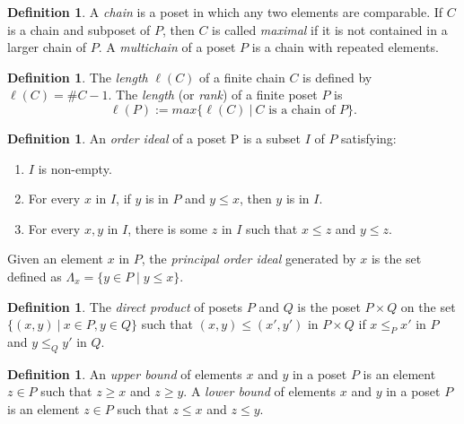 \documentclass[psamsfonts]{amsart}
\theoremstyle{definition}
\newtheorem{defn}[thm]{Definition}
\theoremstyle{remark}
\numberwithin{equation}{section}
\begin{document}
\begin{defn}
A \textit{chain} is a poset in which any two elements are comparable. If $C$ is a chain and subposet of $P$, then $C$ is called \textit{maximal} if it is not contained in a larger chain of $P$. A \textit{multichain} of a poset $P$ is a chain with repeated elements. 
\end{defn}
\begin{defn}
The \textit{length} $\ell(C)$ of a finite chain $C$ is defined by $\ell(C) = \#C - 1$. The \textit{length} (or \textit{rank}) of a finite poset $P$ is
\begin{equation*}
    \ell(P) := max\{\ell(C) \ | \ C \text{ is a chain of } P\}.
\end{equation*}
\end{defn}

\begin{defn}
An \textit{order ideal} of a poset P is a subset $I$ of $P$ satisfying:
\begin{enumerate}
    \item $I$ is non-empty.
    \item For every $x$ in $I$, if $y$ is in $P$ and $y\leq x$, then $y$ is in $I$.
    \item For every $x,y$ in $I$, there is some $z$ in $I$ such that $x\leq z$ and $y\leq z$.
\end{enumerate}
Given an element $x$ in $P$, the \textit{principal order ideal} generated by $x$ is the set defined as $\Lambda_x=\{y\in P \mid y \leq x\}$.
\end{defn}

\begin{defn}
The \textit{direct product} of posets $P$ and $Q$ is the poset $P\times Q$ on the set $\{(x,y) \ | \ x\in P, y\in Q\}$ such that $(x,y)\leq (x',y')$ in $P\times Q$ if $x\leq_P x'$ in $P$ and $y\leq_Q y'$ in $Q$.
\end{defn}

\begin{defn}
An \textit{upper bound} of elements $x$ and $y$ in a poset $P$ is an element $z\in P$ such that $z\geq x$ and $z\geq y$. 
A \textit{lower bound} of elements $x$ and $y$ in a poset $P$ is an element $z\in P$ such that $z\leq x$ and $z\leq y$.
\end{defn}
\end{document}
